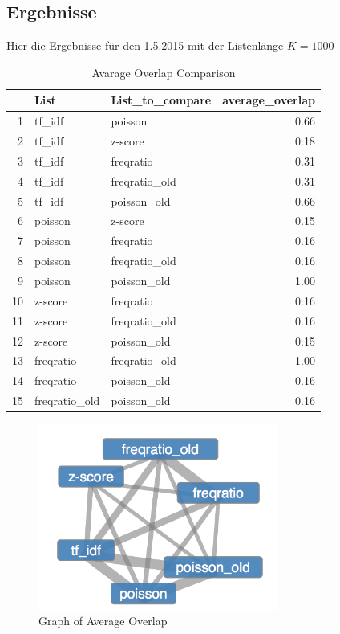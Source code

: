\subsection{Ergebnisse}
Hier die Ergebnisse f\"ur den 1.5.2015 mit der Listenl\"ange $K=1000$
\begin{table}[ht]
\centering
\begin{tabular}{rllr}
  \hline
 & List & List\_to\_compare & average\_overlap \\ 
  \hline
1 & tf\_idf & poisson & 0.66 \\ 
  2 & tf\_idf & z-score & 0.18 \\ 
  3 & tf\_idf & freqratio & 0.31 \\ 
  4 & tf\_idf & freqratio\_old & 0.31 \\ 
  5 & tf\_idf & poisson\_old & 0.66 \\ 
  6 & poisson & z-score & 0.15 \\ 
  7 & poisson & freqratio & 0.16 \\ 
  8 & poisson & freqratio\_old & 0.16 \\ 
  9 & poisson & poisson\_old & 1.00 \\ 
  10 & z-score & freqratio & 0.16 \\ 
  11 & z-score & freqratio\_old & 0.16 \\ 
  12 & z-score & poisson\_old & 0.15 \\ 
  13 & freqratio & freqratio\_old & 1.00 \\ 
  14 & freqratio & poisson\_old & 0.16 \\ 
  15 & freqratio\_old & poisson\_old & 0.16 \\ 
   \hline
\end{tabular}
\caption{Avarage Overlap Comparison} 
\label{AvarageOverlapComparison}
\end{table}\begin{figure}[htbp] 
  \centering
     \includegraphics[width=0.7\textwidth]{pictures/comparison.png}
  \caption{Graph of Average Overlap}
  \label{fig:comparisonGraph}
\end{figure}
